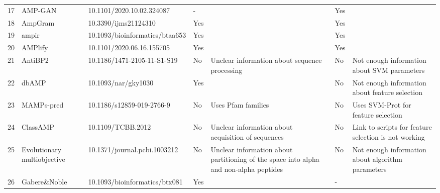 \begin{table}[ht]
\begin{tabular}{rllllll}
  17 & AMP-GAN & 10.1101/2020.10.02.324087 & - &  & Yes &  \\ 
  18 & AmpGram & 10.3390/ijms21124310 & Yes &  & Yes &  \\ 
  19 & ampir & 10.1093/bioinformatics/btaa653 & Yes &  & Yes &  \\ 
  20 & AMPlify & 10.1101/2020.06.16.155705 & Yes &  & Yes &  \\ 
  21 & AntiBP2 & 10.1186/1471-2105-11-S1-S19 & No & Unclear information about sequence processing & No & Not enough information about SVM parameters \\ 
  22 & dbAMP & 10.1093/nar/gky1030 & Yes &  & No & Not enough information about feature selection \\ 
  23 & MAMPs-pred & 10.1186/s12859-019-2766-9 & No & Uses Pfam families & No & Uses SVM-Prot for feature selection \\ 
  24 & ClassAMP & 10.1109/TCBB.2012 & No & Unclear information about acquisition of sequences & No & Link to scripts for feature selection is not working \\ 
  25 & Evolutionary multiobjective & 10.1371/journal.pcbi.1003212 & No & Unclear information about partitioning of the space into alpha and non-alpha peptides & No & Not enough information about algorithm parameters \\ 
  26 & Gabere\&Noble & 10.1093/bioinformatics/btx081 & Yes &  & - &  \\ 
   \hline
\end{tabular}
\end{table}

